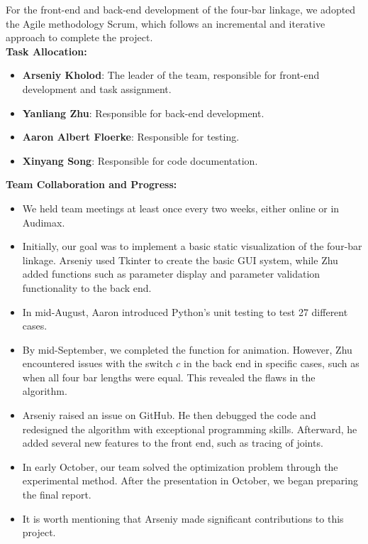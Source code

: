 \documentclass{article}
\begin{document}
For the front-end and back-end development of the four-bar linkage, we adopted the Agile methodology Scrum, which follows an incremental and iterative approach to complete the project.\\

\textbf{Task Allocation:}
\begin{itemize}
    \item \textbf{Arseniy Kholod}: The leader of the team, responsible for front-end development and task assignment.
    \item \textbf{Yanliang Zhu}: Responsible for back-end development.
    \item \textbf{Aaron Albert Floerke}: Responsible for testing.
    \item \textbf{Xinyang Song}: Responsible for code documentation.
\end{itemize}

\textbf{Team Collaboration and Progress:}
\begin{itemize}
    \item We held team meetings at least once every two weeks, either online or in Audimax. 
    \item Initially, our goal was to implement a basic static visualization of the four-bar linkage. Arseniy used Tkinter to create the basic GUI system, while Zhu added functions such as parameter display and parameter validation functionality to the back end.
    \item In mid-August, Aaron introduced Python's unit testing to test 27 different cases.
    \item By mid-September, we completed the function for animation. However, Zhu encountered issues with the switch \(c\) in the back end in specific cases, such as when all four bar lengths were equal. This revealed the flaws in the algorithm.
    \item Arseniy raised an issue on GitHub. He then debugged the code and redesigned the algorithm with exceptional programming skills. Afterward, he added several new features to the front end, such as tracing of joints.
    \item In early October, our team solved the optimization problem through the experimental method. After the presentation in October, we began preparing the final report.  
    \item It is worth mentioning that Arseniy made significant contributions to this project.
\end{itemize}
\end{document}

